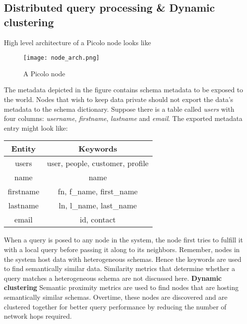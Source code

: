 \subsection{Distributed query processing \& Dynamic clustering} \label{sec:dynamic_cluster}
High level architecture of a Picolo node looks like 
\begin{figure}[h!] \centering
	\texttt{[image: node\_arch.png]}
	\caption{A Picolo node}
	\label{fig:node_arch}
\end{figure}
The metadata depicted in the figure contains schema metadata to be exposed to the world. Nodes that wish to keep data private should not export the data's metadata to the schema dictionary. Suppose there is a table called \textit{users} with four columns: \textit{username}, \textit{firstname}, \textit{lastname} and \textit{email}. The exported metadata entry might look like:
\begin{center}
	\begin{tabular}{| c | c |} 
		\hline
		Entity & Keywords \\ [0.5ex] 
		\hline
		users & user, people, customer, profile\\ 
		\hline
		name & name \\
		\hline
		firstname & fn, {f\_name}, {first\_name} \\
		\hline
		lastname & ln, {l\_name}, {last\_name} \\
		\hline
		email & id, contact \\ [1ex] 
		\hline
	\end{tabular}
\end{center}
When a query is posed to any node in the system, the node first tries to fulfill it with a local query before passing it along to its neighbors. Remember, nodes in the system host data with heterogeneous schemas. Hence the keywords are used to find semantically similar data. Similarity metrics that determine whether a query matches a heterogeneous schema are not discussed here.
\newline\newline
\textbf{Dynamic clustering}
Semantic proximity metrics are used to find nodes that are hosting semantically similar schemas. Overtime, these nodes are discovered and are clustered together for better query performance by reducing the number of network hops required.

